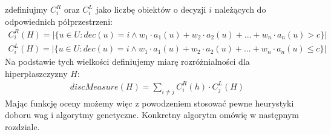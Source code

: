 \documentclass[magisterska]{pracamgr}
\theoremstyle{plain}
\theoremstyle{definition}
\theoremstyle{remark}
\begin{document}
zdefiniujmy $C_i^R$ oraz $C_i^L$ jako liczbę obiektów o decyzji $i$ należących do odpowiednich półprzestrzeni:
\begin{align*}
C_i^R(H) = |\{u \in U: dec(u) = i \wedge w_1 \cdot a_1(u) + w_2 \cdot a_2(u) + ... + w_n \cdot a_n(u) > c\}| \\
C_i^L(H) = |\{u \in U: dec(u) = i \wedge w_1 \cdot a_1(u) + w_2 \cdot a_2(u) + ... + w_n \cdot a_n(u) \leq c\}|
\end{align*}
Na podstawie tych wielkości definiujemy miarę rozróżnialności dla hiperpłaszczyzny $H$:
\begin{align*}
discMeasure(H) = \sum_{i \neq j} C_i^R(h) \cdot C_j^L(H)
\end{align*}
Mając funkcję oceny możemy więc z powodzeniem stosować pewne heurystyki doboru wag i algorytmy genetyczne. Konkretny algorytm omówię w następnym
rozdziale.
\end{document}
